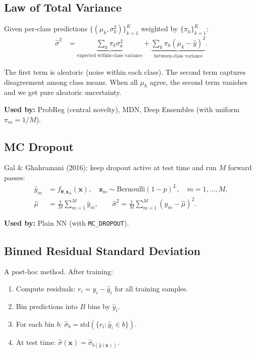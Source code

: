 \documentclass[11pt,a4paper]{article}
\theoremstyle{definition}
\newcommand{\bx}{\mathbf{x}}
\newcommand{\btheta}{\boldsymbol{\theta}}
\begin{document}
\subsection{Law of Total Variance}
\label{sec:uq_lotv}

Given per-class predictions $\{(\mu_k, \sigma_k^2)\}_{k=1}^{K}$ weighted by
$\{\pi_k\}_{k=1}^{K}$:
\begin{align}
  \hat{\sigma}^2 &= \underbrace{\sum_k \pi_k \sigma_k^2}_{\text{expected within-class variance}} + \underbrace{\sum_k \pi_k (\mu_k - \hat{y})^2}_{\text{between-class variance}}.
\end{align}

The first term is aleatoric (noise within each class). The second term
captures disagreement among class means. When all $\mu_k$ agree, the
second term vanishes and we get pure aleatoric uncertainty.

\textbf{Used by:} ProbReg (central novelty), MDN, Deep Ensembles (with
uniform $\pi_m = 1/M$).

\subsection{MC Dropout}
\label{sec:uq_mcdropout}

Gal \& Ghahramani (2016): keep dropout active at test time and run $M$
forward passes:
\begin{align}
  \hat{y}_m &= f_{\btheta, \mathbf{z}_m}(\bx), \quad \mathbf{z}_m \sim \text{Bernoulli}(1-p)^L, \quad m = 1, \ldots, M, \\
  \hat{\mu} &= \frac{1}{M}\sum_{m=1}^M \hat{y}_m, \qquad
  \hat{\sigma}^2 = \frac{1}{M}\sum_{m=1}^M (\hat{y}_m - \hat{\mu})^2.
\end{align}

\textbf{Used by:} Plain NN (with \texttt{MC\_DROPOUT}).

\subsection{Binned Residual Standard Deviation}
\label{sec:uq_binned}

A post-hoc method. After training:
\begin{enumerate}[nosep]
  \item Compute residuals: $r_i = y_i - \hat{y}_i$ for all training samples.
  \item Bin predictions into $B$ bins by $\hat{y}_i$.
  \item For each bin $b$: $\hat{\sigma}_b = \mathrm{std}(\{r_i : \hat{y}_i \in b\})$.
  \item At test time: $\hat{\sigma}(\bx) = \hat{\sigma}_{b(\hat{y}(\bx))}$.
\end{enumerate}
\end{document}

